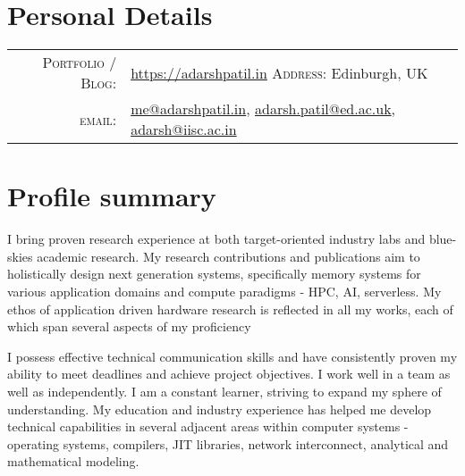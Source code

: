 \documentclass[a4paper,10pt]{article} %
\begin{document}
\pagestyle{empty} %



\par{\bigskip\par} %

\section{Personal Details}

\begin{tabular}{rl}
\textsc{Portfolio / Blog:} & \href{https://adarshpatil.in/timewarp}{https://adarshpatil.in} \hspace{2cm} \textsc{Address:} Edinburgh, UK\\
\textsc{email:} & \href{mailto:me@adarshpatil.in}{me@adarshpatil.in}, \href{mailto:adarsh.patil@ed.ac.uk}{adarsh.patil@ed.ac.uk}, \href{mailto:adarsh@iisc.ac.in}{adarsh@iisc.ac.in}\\
\end{tabular}

\section{Profile summary}
I bring proven research experience at both target-oriented industry labs and blue-skies academic research.
My research contributions and publications aim to holistically design next generation systems, specifically memory systems for various application domains and compute paradigms - HPC, AI, serverless.
My ethos of application driven hardware research is reflected in all my works, each of which span several aspects of my proficiency

I possess effective technical communication skills and have consistently proven my ability to meet deadlines and achieve project objectives. I work well in a team as well as independently. I am a constant learner, striving to expand my sphere of understanding. My education and industry experience has helped me develop technical capabilities in several adjacent areas within computer systems - operating systems, compilers, JIT libraries, network interconnect, analytical and mathematical modeling. 
\end{document}
